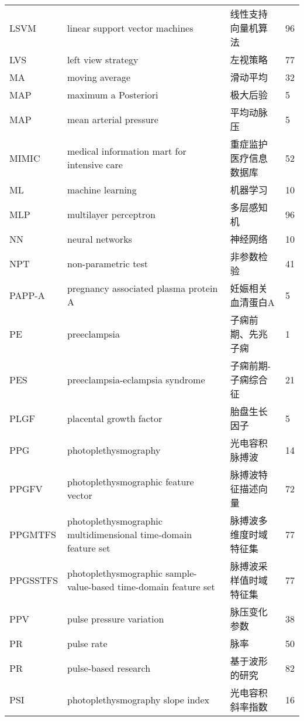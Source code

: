\begin{center}
\begin{longtable}{m{2cm}m{7cm}m{5cm}m{1cm}<{\centering}}
        LSVM & linear support vector machines & 线性支持向量机算法 & 96 \\
        LVS & left view strategy & 左视策略 & 77 \\
        MA & moving average & 滑动平均& 32 \\
        MAP     &       maximum a Posteriori                         &   极大后验                 &    5   \\
        MAP     &   mean arterial pressure                              & 平均动脉压 & 5 \\
        MIMIC & medical information mart for intensive care & 重症监护医疗信息数据库 &52\\
        ML     & machine learning  & 机器学习  & 10    \\
        MLP & multilayer perceptron & 多层感知机 & 96 \\
        NN & neural networks & 神经网络 & 10 \\
        NPT & non-parametric test & 非参数检验 & 41 \\
        PAPP­-A     &       pregnancy associated plasma protein A                         &   妊娠相关血清蛋白A                 &    5   \\
        PE      &       preeclampsia                                    &   子痫前期、先兆子痫      &   1   \\
        PES & preeclampsia-eclampsia syndrome& 子痫前期-子痫综合征& 21 \\
        PLGF     &       placental growth factor                         &   胎盘生长因子                 &    5   \\
        PPG & photoplethysmography & 光电容积脉搏波 & 14 \\
        PPGFV &photoplethysmographic feature vector&  脉搏波特征描述向量 & 72\\
        PPGMTFS &     photoplethysmographic multidimensional time-domain feature set & 脉搏波多维度时域特征集 & 77 \\
        PPGSSTFS &     photoplethysmographic sample-value-based time-domain feature set & 脉搏波采样值时域特征集 & 77 \\
        PPV & pulse pressure variation & 脉压变化参数 & 38 \\
        PR & pulse rate & 脉率 & 50\\
        PR & pulse-based research & 基于波形的研究 & 82 \\
        PSI & photoplethysmography slope index& 光电容积斜率指数& 16\\

\end{longtable}
\end{center}
